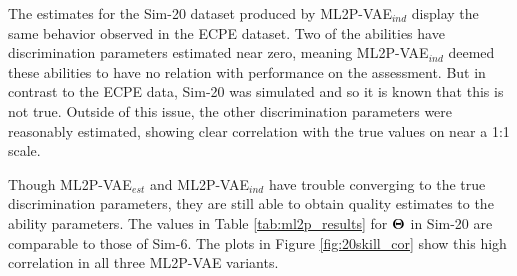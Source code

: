 The estimates for the Sim-20 dataset produced by ML2P-VAE$_{ind}$ display the same behavior observed in the ECPE dataset. Two of the abilities have discrimination parameters estimated near zero, meaning ML2P-VAE$_{ind}$ deemed these abilities to have no relation with performance on the assessment. But in contrast to the ECPE data, Sim-20 was simulated and so it is known that this is not true. Outside of this issue, the other discrimination parameters were reasonably estimated, showing clear correlation with the true values on near a 1:1 scale.

Though ML2P-VAE$_{est}$ and ML2P-VAE$_{ind}$ have trouble converging to the true discrimination parameters, they are still able to obtain quality estimates to the ability parameters. The values in Table \ref{tab:ml2p_results} for $\boldsymbol{\Theta}$ in Sim-20 are comparable to those of Sim-6. The plots in Figure \ref{fig:20skill_cor} show this high correlation in all three ML2P-VAE variants.


